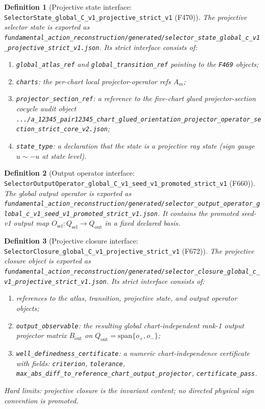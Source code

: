 \documentclass[11pt,a4paper]{article}
\newtheorem{definition}{Definition}[section]
\begin{document}
\begin{definition}[Projective state interface: \texttt{SelectorState\_global\_C\_v1\_projective\_strict\_v1} (F470)]
The projective selector state is exported as
\verb|fundamental_action_reconstruction/generated/selector_state_global_c_v1_projective_strict_v1.json|.
Its strict interface consists of:
\begin{enumerate}[label=\arabic*.]
  \item \texttt{global\_atlas\_ref} and \texttt{global\_transition\_ref} pointing to the \texttt{F469} objects;
  \item \texttt{charts}: the per-chart local projector-operator refs $A_m$;
  \item \texttt{projector\_section\_ref}: a reference to the five-chart glued projector-section cocycle audit object
  \verb|.../a_12345_pair12345_chart_glued_orientation_projector_operator_section_strict_core_v2.json|;
  \item \texttt{state\_type}: a declaration that the state is a \emph{projective ray state}
  (sign gauge $u\sim -u$ at state level).
\end{enumerate}
\end{definition}

\begin{definition}[Output operator interface: \texttt{SelectorOutputOperator\_global\_C\_v1\_seed\_v1\_promoted\_strict\_v1} (F660)]
The global output operator is exported as
\verb|fundamental_action_reconstruction/generated/selector_output_operator_global_c_v1_seed_v1_promoted_strict_v1.json|.
It contains the promoted seed-v1 output map $O_{\mathrm{sel}}:Q_{\mathrm{sel}}\to Q_{\mathrm{out}}$ in a fixed declared basis.
\end{definition}

\begin{definition}[Projective closure interface: \texttt{SelectorClosure\_global\_C\_v1\_projective\_strict\_v1} (F672)]
The projective closure object is exported as
\verb|fundamental_action_reconstruction/generated/selector_closure_global_c_v1_projective_strict_v1.json|.
Its strict interface consists of:
\begin{enumerate}[label=\arabic*.]
  \item references to the atlas, transition, projective state, and output operator objects;
  \item \texttt{output\_observable}: the resulting global chart-independent rank-1 output projector matrix $B_{\mathrm{out}}$ on $Q_{\mathrm{out}}=\mathrm{span}\{o_+,o_-\}$;
  \item \texttt{well\_definedness\_certificate}: a numeric chart-independence certificate with fields:
  \texttt{criterion}, \texttt{tolerance}, \texttt{max\_abs\_diff\_to\_reference\_chart\_output\_projector}, \texttt{certificate\_pass}.
\end{enumerate}
\emph{Hard limits:} projective closure is the invariant content; no directed physical sign convention is promoted.
\end{definition}
\end{document}
